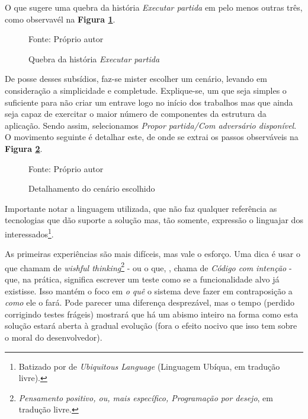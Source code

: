   O que sugere uma quebra da história \emph{Executar partida} em pelo menos
  outras três, como observavél na \textbf{Figura \ref{fig:executar-partida}}.

  \begin{figure}[h]
    \centering
    \caption{Quebra da história \emph{Executar partida}}
    
    Fonte: Próprio autor
    \label{fig:executar-partida}
  \end{figure}

  De posse desses subsídios, faz-se mister escolher um cenário, levando em
  consideração a simplicidade e completude. Explique-se, um que seja simples
  o suficiente para não criar um entrave logo no início dos trabalhos mas
  que ainda seja capaz de exercitar o maior número de componentes da
  estrutura da aplicação. Sendo assim, selecionamos
  \emph{Propor partida/Com adversário disponível}. O movimento seguinte é
  detalhar este, de onde se extrai os passos observáveis na \textbf{Figura
  \ref{fig:passos-primeiro-cenario-escolhido}}.

  \begin{figure}[h]
    \centering
    \caption{Detalhamento do cenário escolhido}
    
    Fonte: Próprio autor\footnotemark
    \label{fig:passos-primeiro-cenario-escolhido}
  \end{figure}

  Importante notar a linguagem utilizada, que não faz qualquer referência as
  tecnologias que dão suporte a solução mas, tão somente, expressão o
  linguajar dos interessados\footnote{Batizado por
   de \emph{Ubiquitous Language} (Linguagem Ubíqua, em tradução
  livre).}.

  As primeiras experiências são mais difíceis, mas vale o esforço. Uma dica
  é usar o que  chamam de \emph{
  wishful thinking}\footnote{\emph{Pensamento positivo, ou, mais
  específico, Programação por desejo}, em tradução livre.} - ou o que,
  , chama de \emph{Código com intenção}
  - que, na prática, significa escrever um teste como se a funcionalidade
  alvo já existisse. Isso mantém o foco em \emph{o quê} o sistema deve fazer
  em contraposição a \emph{como} ele o fará. Pode parecer uma diferença
  desprezável, mas o tempo (perdido corrigindo testes frágeis) mostrará que
  há um abismo inteiro na forma como esta solução estará aberta à gradual
  evolução (fora o efeito nocivo que isso tem sobre o moral do desenvolvedor).

